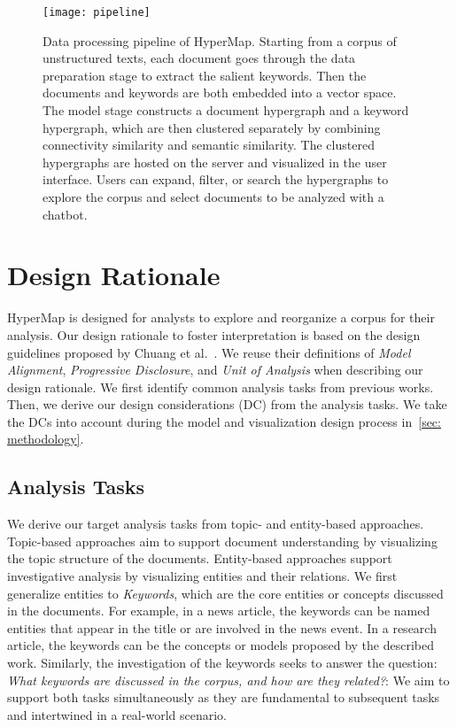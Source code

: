 \begin{figure*}[htbp]
 \centering %
 \texttt{[image: pipeline]}
 \caption{Data processing pipeline of HyperMap. 
 Starting from a corpus of unstructured texts, each document goes through the data preparation stage to extract the salient keywords.
 Then the documents and keywords are both embedded into a vector space.
 The model stage constructs a document hypergraph and a keyword hypergraph, which are then clustered separately by combining connectivity similarity and semantic similarity.
 The clustered hypergraphs are hosted on the server and visualized in the user interface.
 Users can expand, filter, or search the hypergraphs to explore the corpus and select documents to be analyzed with a chatbot.
  }\label{fig:pipeline}
\end{figure*}

\section{Design Rationale}\label{sec: design_rationale}
HyperMap is designed for analysts to explore and reorganize a corpus for their analysis.
Our design rationale to foster interpretation is based on the design guidelines proposed by Chuang et al.~\cite{chuang2012interpretation}.
We reuse their definitions of \textit{Model Alignment}, \textit{Progressive Disclosure}, and \textit{Unit of Analysis} when describing our design rationale.
We first identify common analysis tasks from previous works.
Then, we derive our design considerations (DC) from the analysis tasks.
We take the DCs into account during the model and visualization design process in~\autoref{sec: methodology}.

\subsection{Analysis Tasks}
We derive our target analysis tasks from topic- and entity-based approaches.
Topic-based approaches aim to support document understanding by visualizing the topic structure of the documents.
Entity-based approaches support investigative analysis by visualizing entities and their relations.
We first generalize entities to \textit{Keywords}, which are the core entities or concepts discussed in the documents.
For example, in a news article, the keywords can be named entities that appear in the title or are involved in the news event.
In a research article, the keywords can be the concepts or models proposed by the described work.
Similarly, the investigation of the keywords seeks to answer the question: \textit{What keywords are discussed in the corpus, and how are they related?}: 
We aim to support both tasks simultaneously as they are fundamental to subsequent tasks and intertwined in a real-world scenario.

